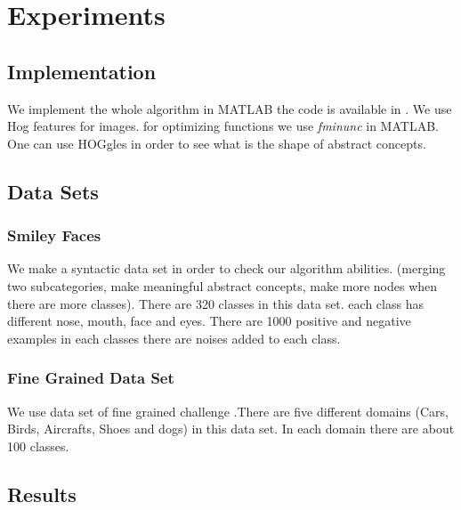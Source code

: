 \documentclass[10pt,twocolumn,letterpaper]{article}
\begin{document}
\section {Experiments}
 
 \subsection {Implementation}
 We implement the whole algorithm in MATLAB the code is available in \cite{code}. We use Hog features for images. for optimizing functions we use \textit{fminunc} in MATLAB.
 One can use HOGgles \cite{hoggles} in order to see what is the shape of abstract concepts.
 
 \subsection{Data Sets}
 \subsubsection{Smiley Faces}
 We make a syntactic data set in order to check our algorithm abilities. (merging two subcategories, make meaningful abstract concepts, make more nodes when there are more classes). There are 320 classes in this data set. each class has different nose, mouth, face and eyes. There are 1000 positive and negative examples in each classes there are noises added to each class. 
 \subsubsection{Fine Grained Data Set}
 We use data set of fine grained challenge \cite{dataset}.There are five different domains (Cars, Birds, Aircrafts, Shoes and dogs) in this data set. In each domain there are about 100 classes. 
 \subsection{Results}
\end{document}
